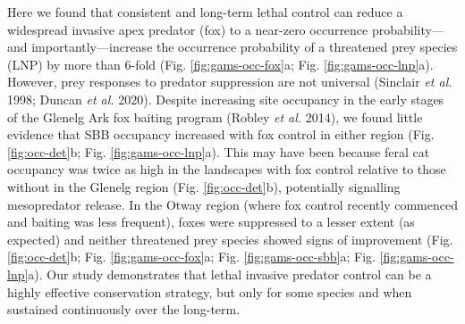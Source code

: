 \documentclass[11pt,a4paper,titlepage,twoside,openright]{style/unimelbthesis}
\begin{document}
\begin{mainmatter}
Here we found that consistent and long-term lethal control can reduce a widespread invasive apex predator (fox) to a near-zero occurrence probability---and importantly---increase the occurrence probability of a threatened prey species (LNP) by more than 6-fold (Fig. \ref{fig:gams-occ-fox}a; Fig. \ref{fig:gams-occ-lnp}a). However, prey responses to predator suppression are not universal (Sinclair \emph{et al.} 1998; Duncan \emph{et al.} 2020). Despite increasing site occupancy in the early stages of the Glenelg Ark fox baiting program (Robley \emph{et al.} 2014), we found little evidence that SBB occupancy increased with fox control in either region (Fig. \ref{fig:occ-det}b; Fig. \ref{fig:gams-occ-lnp}a). This may have been because feral cat occupancy was twice as high in the landscapes with fox control relative to those without in the Glenelg region (Fig. \ref{fig:occ-det}b), potentially signalling mesopredator release. In the Otway region (where fox control recently commenced and baiting was less frequent), foxes were suppressed to a lesser extent (as expected) and neither threatened prey species showed signs of improvement (Fig. \ref{fig:occ-det}b; Fig. \ref{fig:gams-occ-fox}a; Fig. \ref{fig:gams-occ-sbb}a; Fig. \ref{fig:gams-occ-lnp}a). Our study demonstrates that lethal invasive predator control can be a highly effective conservation strategy, but only for some species and when sustained continuously over the long-term.


\end{mainmatter}
\end{document}
